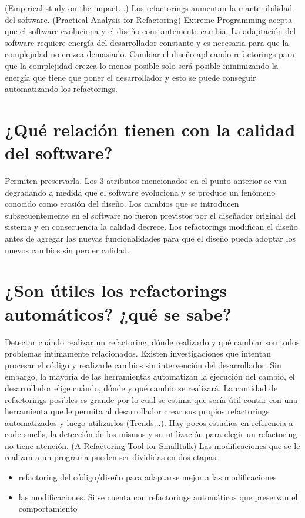(Empirical study on the impact...)
Los refactorings aumentan la mantenibilidad del software.
(Practical Analysis for Refactoring)
Extreme Programming acepta que el software evoluciona y el diseño constantemente cambia. La
adaptación del software requiere energía del desarrollador constante y es necesaria para que la
complejidad no crezca demasiado. Cambiar el diseño aplicando refactorings para que la complejidad
crezca lo menos posible solo será posible minimizando la energía que tiene que poner el
desarrollador y esto se puede conseguir automatizando los refactorings.


\section{¿Qué relación tienen con la calidad del software?}
Permiten preservarla. Los 3 atributos mencionados en el punto anterior se van
degradando a medida que el software evoluciona y se produce un fenómeno conocido como erosión del
diseño. Los cambios que se introducen subsecuentemente en el software no fueron previstos por el
diseñador original del sistema y en consecuencia la calidad decrece. Los refactorings modifican el
diseño antes de agregar las nuevas funcionalidades para que el diseño pueda adoptar los nuevos
cambios sin perder calidad.


\section{¿Son útiles los refactorings automáticos? ¿qué se sabe?}
Detectar cuándo realizar un refactoring, dónde realizarlo y qué cambiar son todos problemas
íntimamente relacionados. Existen investigaciones que intentan procesar el código y realizarle
cambios sin intervención del desarrollador. Sin embargo, la mayoría de las herramientas automatizan
la ejecución del cambio, el desarrollador elige cuándo, dónde y qué cambio se realizará. La cantidad
de refactorings posibles es grande por lo cual se estima que sería útil contar con una herramienta
que le permita al desarrollador crear sus propios refactorings automatizados y luego utilizarlos
(Trends...). Hay pocos estudios en referencia a code smells, la detección de los mismos y su
utilización para elegir un refactoring no tiene atención.
(A Refactoring Tool for Smalltalk)
Las modificaciones que se le realizan a un programa pueden ser divididas en dos etapas:

\begin{itemize}
    \item refactoring del código/diseño para adaptarse mejor a las modificaciones
    \item las modificaciones. Si se cuenta con refactorings automáticos que preservan el comportamiento
\end{itemize}

